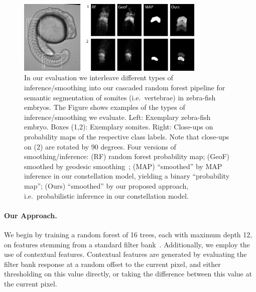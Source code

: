 \documentclass[10pt,twocolumn,letterpaper]{article}
\begin{document}
\begin{figure}[t]
\begin{center}
\includegraphics[width=0.8\textwidth]{smoothing.jpg} %
\caption{In our evaluation we interleave different types of inference/smoothing into our cascaded random forest pipeline for semantic segmentation of somites (i.e.\ vertebrae) in zebra-fish embryos. 
%
The Figure shows examples of the types of inference/smoothing we evaluate. 
Left: Exemplary zebra-fish embryo. Boxes (1,2): Exemplary somites. Right: Close-ups on probability maps of the respective class labels. Note that close-ups on (2) are rotated by 90 degrees. 
%
Four versions of smoothing/inference: (RF) random forest probability map; (GeoF) smoothed by geodesic smoothing~\cite{GeoForests2013}; (MAP) ``smoothed'' by MAP inference in our constellation model, yielding a binary ``probability map''; 
%
(Ours) ``smoothed'' by our proposed approach, i.e.\ probabilistic inference in our constellation model.  }
\label{fig:smoothing}
\end{center}
\end{figure}
%


\paragraph{Our Approach. }

We begin by training a random forest of 16 trees, each with maximum depth 12, on features stemming from a standard filter bank~\cite{hall2009weka}.  Additionally, we employ the use of contextual features. 
Contextual features are generated by evaluating the filter bank response at a random offset to the current pixel, and either thresholding on this value directly, or taking the difference between this value at the current pixel.  
\end{document}
